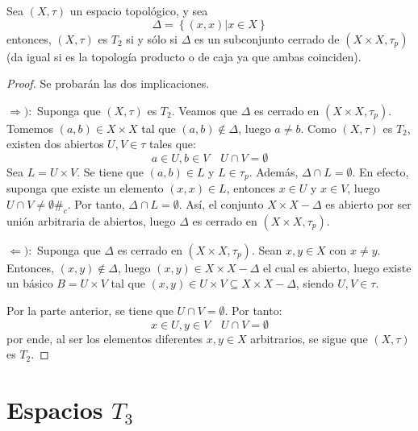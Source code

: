 \documentclass[12pt]{report}
\theoremstyle{largebreak}
\newcommand\contradiction{\ensuremath{\#_c}}
\begin{document}
    \begin{propo}
        Sea $(X,\tau)$ un espacio topológico, y sea
        \begin{equation*}
            \Delta=\left\{(x,x)\Big|x\in X \right\}
        \end{equation*}
        entonces, $(X,\tau)$ es $T_2$ si y sólo si $\Delta$ es un subconjunto cerrado de $(X\times X,\tau_p)$ (da igual si es la topología producto o de caja ya que ambas coinciden).
    \end{propo}

    \begin{proof}
        Se probarán las dos implicaciones.

        $\Rightarrow):$ Suponga que $(X,\tau)$ es $T_2$. Veamos que $\Delta$ es cerrado en $(X\times X,\tau_p)$. Tomemos $(a,b)\in X\times X$ tal que $(a,b)\notin\Delta$, luego $a\neq b$. Como $(X,\tau)$ es $T_2$, existen dos abiertos $U,V\in\tau$ tales que:
        \begin{equation*}
            a\in U,b\in V\quad U\cap V=\emptyset
        \end{equation*}
        Sea $L=U\times V$. Se tiene que $(a,b)\in L$ y $L\in\tau_p$. Además, $\Delta\cap L=\emptyset$. En efecto, suponga que existe un elemento $(x,x)\in L$, entonces $x\in U$ y $x\in V$, luego $U\cap V\neq\emptyset$\contradiction. Por tanto, $\Delta\cap L=\emptyset$. Así, el conjunto $X\times X-\Delta$ es abierto por ser unión arbitraria de abiertos, luego $\Delta$ es cerrado en $(X\times X,\tau_p)$.

        $\Leftarrow):$ Suponga que $\Delta$ es cerrado en $(X\times X,\tau_p)$. Sean $x,y\in X$ con $x\neq y$. Entonces, $(x,y)\notin\Delta$, luego $(x,y)\in X\times X-\Delta$ el cual es abierto, luego existe un básico $B=U\times V$ tal que $(x,y)\in U\times V\subseteq X\times X-\Delta$, siendo $U,V\in\tau$.

        Por la parte anterior, se tiene que $U\cap V=\emptyset$. Por tanto:
        \begin{equation*}
            x\in U,y\in V\quad U\cap V=\emptyset
        \end{equation*}
        por ende, al ser los elementos diferentes $x,y\in X$ arbitrarios, se sigue que $(X,\tau)$ es $T_2$.
    \end{proof}

    \section{Espacios $T_3$}
\end{document}
